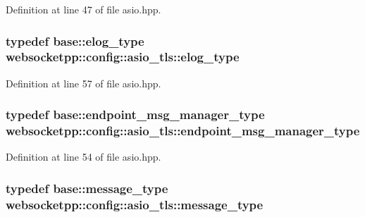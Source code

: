 Definition at line 47 of file asio.\+hpp.

\hypertarget{structwebsocketpp_1_1config_1_1asio__tls_a81b08cb436d7666730391fc9f3c73de7}{}
\subsubsection[{elog\+\_\+type}]{\setlength{\rightskip}{0pt plus 5cm}typedef {\bf base\+::elog\+\_\+type} {\bf websocketpp\+::config\+::asio\+\_\+tls\+::elog\+\_\+type}}\label{structwebsocketpp_1_1config_1_1asio__tls_a81b08cb436d7666730391fc9f3c73de7}


Definition at line 57 of file asio.\+hpp.

\hypertarget{structwebsocketpp_1_1config_1_1asio__tls_a7fdb90dbe56e52adc2d99e38d4fc626d}{}
\subsubsection[{endpoint\+\_\+msg\+\_\+manager\+\_\+type}]{\setlength{\rightskip}{0pt plus 5cm}typedef {\bf base\+::endpoint\+\_\+msg\+\_\+manager\+\_\+type} {\bf websocketpp\+::config\+::asio\+\_\+tls\+::endpoint\+\_\+msg\+\_\+manager\+\_\+type}}\label{structwebsocketpp_1_1config_1_1asio__tls_a7fdb90dbe56e52adc2d99e38d4fc626d}


Definition at line 54 of file asio.\+hpp.

\hypertarget{structwebsocketpp_1_1config_1_1asio__tls_a27450d727458295e6148c3ed7405e24c}{}
\subsubsection[{message\+\_\+type}]{\setlength{\rightskip}{0pt plus 5cm}typedef {\bf base\+::message\+\_\+type} {\bf websocketpp\+::config\+::asio\+\_\+tls\+::message\+\_\+type}}\label{structwebsocketpp_1_1config_1_1asio__tls_a27450d727458295e6148c3ed7405e24c}


